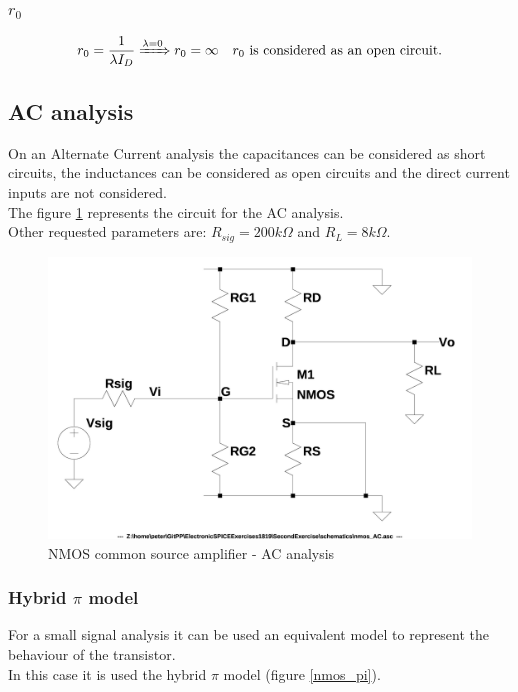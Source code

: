 \documentclass[10pt,a4paper]{book}
\begin{document}
\subsubsection{$r_0$}
\begin{gather}
r_0 = \frac{1}{\lambda I_D} \xRightarrow{\lambda = 0} r_0 = \infty  \quad r_0 \text{ is considered as an open circuit.}
\end{gather}


\subsection{AC analysis}
On an Alternate Current analysis the capacitances can be considered as short circuits, the inductances can be considered as open circuits and the direct current inputs are not considered.\\
The figure \ref{nmos_AC} represents the circuit for the AC analysis.\\
Other requested parameters are: $R_{sig} = 200k\Omega$ and $R_L = 8k\Omega$.\par

\begin{figure}[h]
  \centering
  \includegraphics[width=12cm]{schematics/nmos_AC.jpg}
  \caption{NMOS common source amplifier - AC analysis}
  \label{nmos_AC}
\end{figure}

\subsubsection{Hybrid $\pi$ model}
For a small signal analysis it can be used an equivalent model to represent the behaviour of the transistor.\\
In this case it is used the hybrid $\pi$ model (figure \ref{nmos_pi}).\par
\end{document}

